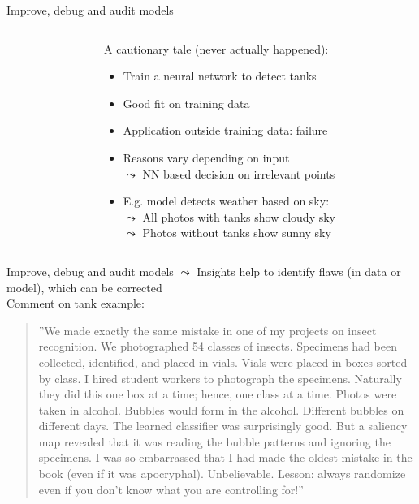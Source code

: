 \documentclass[11pt,compress,t,notes=noshow, aspectratio=169, xcolor=table]{beamer}
\begin{document}
\begin{frame}{Improve, debug and audit models}
\begin{columns}[T, totalwidth = \textwidth]
\begin{column}{0.44\textwidth}
	\end{column}
	\begin{column}{0.56\textwidth}
    \hspace{0.1cm} A cautionary tale (never actually happened):
	\begin{itemize}
	    \item Train a neural network to detect tanks
        \item Good fit on training data
        \item Application outside training data: failure
        \item<2-> Reasons vary depending on input\\
        $\leadsto$ NN based decision on irrelevant points
        \item<3-> E.g. model detects weather based on sky:\\
        $\leadsto$ All photos with tanks show cloudy sky\\
        $\leadsto$ Photos without tanks show sunny sky
	\end{itemize}

	\end{column}
	\end{columns}

\end{frame}

\begin{frame}{Improve, debug and audit models}
$\leadsto$ Insights help to identify flaws (in data or model), which can be corrected \\
\vspace{0.9cm}
	\centering
    Comment on tank example: \\
    \medskip
    \begin{quote}
        ''We made exactly the same mistake in one of my projects on insect recognition. We photographed 54 classes of insects. Specimens had been collected, identified, and placed in vials. Vials were placed in boxes sorted by class. I hired student workers to photograph the specimens. Naturally they did this one box at a time; hence, one class at a time. Photos were taken in alcohol. Bubbles would form in the alcohol. Different bubbles on different days. The learned classifier was surprisingly good. But a saliency map revealed that it was reading the bubble patterns and ignoring the specimens. I was so embarrassed that I had made the oldest mistake in the book (even if it was apocryphal). Unbelievable. Lesson: always randomize even if you don’t know what you are controlling for!''
    \end{quote}
 \end{frame}
\end{document}
